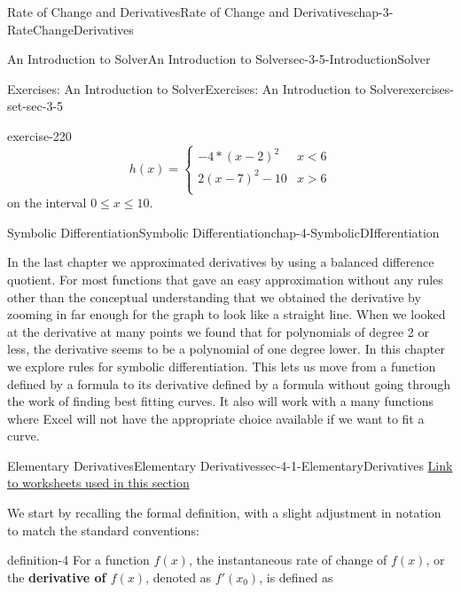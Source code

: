 \documentclass[oneside,10pt,]{book}
\newcommand{\terminology}[1]{\textbf{#1}}
\numberwithin{equation}{section}
\newcommand{\lt}{<}
\newcommand{\gt}{>}
\begin{document}
\begin{chapterptx}{Rate of Change and Derivatives}{}{Rate of Change and Derivatives}{}{}{chap-3-RateChangeDerivatives}
\begin{sectionptx}{An Introduction to Solver}{}{An Introduction to Solver}{}{}{sec-3-5-IntroductionSolver}
\begin{exercises-subsection-numberless}{Exercises: An Introduction to Solver}{}{Exercises: An Introduction to Solver}{}{}{exercises-set-sec-3-5}
\begin{divisionexercise}{10}{}{}{exercise-220}
\begin{equation*}
h(x)=\begin{cases}
-4*(x-2)^2& x \lt 6\\
2(x-7)^2-10&x \gt 6\\
\end{cases}
\end{equation*}
on the interval \(0\le x\le 10\).%
\end{divisionexercise}%
\end{exercises-subsection-numberless}
\end{sectionptx}
\end{chapterptx}
%
%
\typeout{************************************************}
\typeout{************************************************}
%
\begin{chapterptx}{Symbolic Differentiation}{}{Symbolic Differentiation}{}{}{chap-4-SymbolicDIfferentiation}
\begin{introduction}{}%
\hypertarget{p-1418}{}%
In the last chapter we approximated derivatives by using a balanced difference quotient.   For most functions that gave an easy approximation without any rules other than the conceptual understanding that we obtained the derivative by zooming in far enough for the graph to look like a straight line. When we looked at the derivative at many points we found that for polynomials of degree 2 or less, the derivative seems to be a polynomial of one degree lower.  In this chapter we explore rules for symbolic differentiation.  This lets us move from a function defined by a formula to its derivative defined by a formula without going through the work of finding best fitting curves.  It also will work with a many functions where Excel will not have the appropriate choice available if we want to fit a curve.%
\end{introduction}%
%
%
\typeout{************************************************}
\typeout{************************************************}
%
\begin{sectionptx}{Elementary Derivatives}{}{Elementary Derivatives}{}{}{sec-4-1-ElementaryDerivatives}
\hypertarget{p-1419}{}%
\href{./Examples/Section-4-1-Examples.xlsx}{Link to worksheets used in this section}%
\par
\hypertarget{p-1420}{}%
We start by recalling the formal definition, with a slight adjustment in notation to match the standard conventions:%
\begin{definition}{}{definition-4}%
\hypertarget{p-1421}{}%
 For a function \(f(x)\), the instantaneous rate of change of \(f(x)\), or the \terminology{derivative of \(f(x)\)}, denoted as \(f'(x_0)\),   is defined as%

\end{definition}
\end{sectionptx}
\end{chapterptx}
\end{document}
